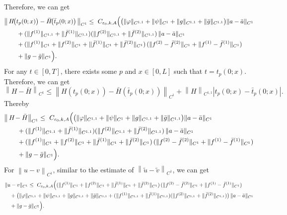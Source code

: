 \documentclass[a4paper,reqno,11pt]{amsart}
\numberwithin{equation}{section} %
\begin{document}
Therefore, we can get
\[
\begin{aligned}
&\bigl\|\,H\!\bigl(t_p(0;x)\bigr)-\bar H\!\bigl(\bar t_p(0;x)\bigr)\,\bigr\|_{C^{1}}
\le{}\ C_{\varepsilon_0,k,A}\Bigl(
	\bigl(\|\varphi\|_{C^{1,1}}+\|\psi\|_{C^{1}}
     + \|g\|_{C^{1,1}}+\|\bar g\|_{C^{1,1}}\bigr)\|a-\bar a\|_{C^{1}}
 \\
&\qquad
     + (\|f^{(1)}\|_{C^{1,1}}+\|\bar f^{(1)}\|_{C^{1,1}})
       (\|f^{(2)}\|_{C^{1,1}}+\|\bar f^{(2)}\|_{C^{1,1}})\,
    \|a-\bar a\|_{C^{1}} \\
&\qquad
	 + (\|f^{(1)}\|_{C^{1}}+\|f^{(2)}\|_{C^{1}}
   +\|\bar f^{(1)}\|_{C^{1}}+\|\bar f^{(2)}\|_{C^{1}})\,
  (\|f^{(2)}-\bar f^{(2)}\|_{C^{1}}
   +\|f^{(1)}-\bar f^{(1)}\|_{C^{1}})\\
&\qquad
  + \|g-\bar g\|_{C^{1}}
\Bigr).
\end{aligned}
\]
For any $t\in [0,T]$, there exists some $p$ and $x\in [0,L]$ such that $t=t_p(0;x)$. Therefore, we can get
$$
\left\| H-\bar{H} \right\| _{C^1}\le \left\| H\left( t_p(0;x) \right) -\bar{H}\left( \bar{t}_p(0;x) \right) \right\| _{C^1}+\left\| H \right\| _{C^{1,1}}\left| t_p(0;x)-\bar{t}_p(0;x) \right|.
$$
Thereby
\[
\begin{aligned}
&\bigl\|\,H\!-\bar H\!\,\bigr\|_{C^{1}}
\le{}\ C_{\varepsilon_0,k,A}\Bigl(
	\bigl(\|\varphi\|_{C^{1,1}}+\|\psi\|_{C^{1}}
     + \|g\|_{C^{1,1}}+\|\bar g\|_{C^{1,1}}\bigr)\|a-\bar a\|_{C^{1}}
 \\
&\qquad
     + (\|f^{(1)}\|_{C^{1,1}}+\|\bar f^{(1)}\|_{C^{1,1}})
       (\|f^{(2)}\|_{C^{1,1}}+\|\bar f^{(2)}\|_{C^{1,1}})\,
    \|a-\bar a\|_{C^{1}} \\
&\qquad
	 + (\|f^{(1)}\|_{C^{1}}+\|f^{(2)}\|_{C^{1}}
   +\|\bar f^{(1)}\|_{C^{1}}+\|\bar f^{(2)}\|_{C^{1}})\,
  (\|f^{(2)}-\bar f^{(2)}\|_{C^{1}}
   +\|f^{(1)}-\bar f^{(1)}\|_{C^{1}})\\
&\qquad
  + \|g-\bar g\|_{C^{1}}
\Bigr).
\end{aligned}
\]
For $\left\| u-v \right\| _{C^1}$, similar to the estimate of $\left\| \tilde{u}-\tilde{v} \right\| _{C^1}$, we can get
\[
\begin{aligned}
&\|u-v\|_{C^{1}}
\le{}\ C_{\varepsilon_0,k,A}\Bigl(
  (\|f^{(1)}\|_{C^{1}}+\|f^{(2)}\|_{C^{1}}
   +\|\bar f^{(1)}\|_{C^{1}}+\|\bar f^{(2)}\|_{C^{1}})\,
  (\|f^{(2)}-\bar f^{(2)}\|_{C^{1}}
   +\|f^{(1)}-\bar f^{(1)}\|_{C^{1}}) \\
&\quad + \bigl(\|\varphi\|_{C^{1,1}}+\|\psi\|_{C^{1,1}}
   + \|g\|_{C^{1,1}}+\|\bar g\|_{C^{1,1}}
   + (\|f^{(1)}\|_{C^{1,1}}+\|\bar f^{(1)}\|_{C^{1,1}})
     (\|f^{(2)}\|_{C^{1,1}}+\|\bar f^{(2)}\|_{C^{1,1}})\bigr)\,
   \|a-\bar a\|_{C^{1}} \\
&\quad + \|g-\bar g\|_{C^{1}}
\Bigr).
\end{aligned}
\]
\end{document}
